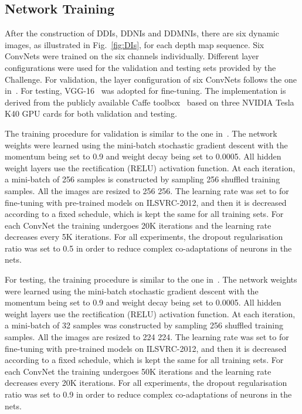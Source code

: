 \documentclass[10pt, a4paper, conference]{IEEEtran}
\begin{document}
\subsection{Network Training}
After the construction of DDIs, DDNIs and DDMNIs, there are six dynamic images, as illustrated in Fig.~\ref{fig:DIs}, for each depth map sequence. Six ConvNets were trained on the six channels individually. Different layer configurations were used for the validation and testing sets provided by the Challenge. For validation, the layer configuration of six ConvNets follows the one in~\cite{krizhevsky2012imagenet}.  For testing, VGG-16~\cite{simonyan2014very} was adopted for fine-tuning. The implementation is derived from the publicly available Caffe toolbox~\cite{jia2014caffe} based on three {NVIDIA Tesla K40 GPU} cards for both validation and testing.

The training procedure for validation is similar to the one in~\cite{krizhevsky2012imagenet}. The network weights were learned using the mini-batch stochastic gradient descent with the momentum being set to 0.9 and weight decay being set to 0.0005. All hidden weight layers use the rectification (RELU) activation function. At each iteration, a mini-batch of 256 samples is constructed by sampling 256 shuffled training samples. All the images are resized to 256  256. The learning rate was set to  for fine-tuning with pre-trained models on ILSVRC-2012, and then it is decreased according to a fixed schedule, which is kept the same for all training sets. For each ConvNet the training undergoes 20K iterations and the learning rate decreases every 5K iterations. For all experiments, the dropout regularisation ratio was set to 0.5 in order to reduce complex co-adaptations of neurons in the nets.

For testing, the training procedure is similar to the one in~\cite{simonyan2014very}. The network weights were learned using the mini-batch stochastic gradient descent with the momentum being set to 0.9 and weight decay being set to 0.0005. All hidden weight layers use the rectification (RELU) activation function. At each iteration, a mini-batch of 32 samples was constructed by sampling 256 shuffled training samples. All the images are resized to 224  224. The learning rate was set to  for fine-tuning with pre-trained models on ILSVRC-2012, and then it is decreased according to a fixed schedule, which is kept the same for all training sets. For each ConvNet the training undergoes 50K iterations and the learning rate decreases every 20K iterations. For all experiments, the dropout regularisation ratio was set to 0.9 in order to reduce complex co-adaptations of neurons in the nets.
\end{document}
